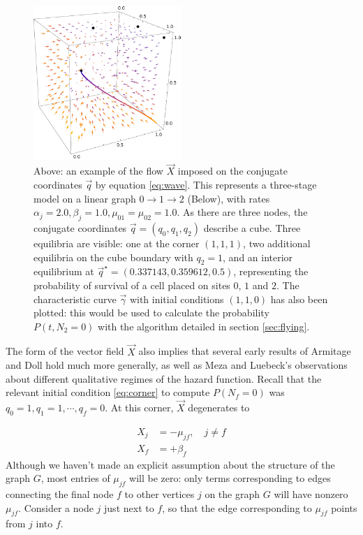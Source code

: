 \documentclass{article}
\begin{document}
\begin{figure}
    \includegraphics[width=0.5\textwidth]{figures/flowcube1}
    \caption{\label{fig:cube}Above: an example of the flow $\vec{X}$ imposed on the
    conjugate coordinates $\vec{q}$ by equation \eqref{eq:wave}. This represents
    a three-stage model on a linear graph $0 \rightarrow 1 \rightarrow 2$ (Below), with rates $\alpha_j = 2.0, \beta_j = 1.0, \mu_{01} = \mu_{02} = 1.0$. As
    there are three nodes, the conjugate coordinates $\vec{q}=(q_0,q_1,q_2)$
    describe a cube. Three equilibria are visible: one at the corner $(1,1,1)$,
    two additional equilibria on the cube boundary with $q_2 = 1$, and
    an interior equilibrium at $\vec{q}^\star = (0.337143, 0.359612, 0.5)$, representing the
    probability of survival of a cell placed on sites $0$, $1$ and $2$. The characteristic
    curve $\vec{\gamma}$ with initial conditions $(1,1,0)$ has also been
    plotted: this would be used to calculate the probability $P(t,N_2 = 0)$ with
    the algorithm detailed in section \ref{sec:flying}.}
\end{figure}

The form of the vector field $\vec{X}$ also implies that several early results
of Armitage and Doll hold much more generally, as well as Meza and Luebeck's observations about different qualitative regimes of the hazard function\cite{armitage1957two,meza2008age}. Recall that the relevant initial condition \eqref{eq:corner} to compute $P(N_f = 0)$ was $q_0 = 1, q_1 = 1, \cdots, q_f = 0$.  At this corner, $\vec{X}$ degenerates to

\begin{align}
    X_j &= - \mu_{jf}, \quad j \neq f
    \nonumber \\
    X_f &= + \beta_f
\end{align}
Although we haven't made an explicit assumption about the structure of the graph
$G$, most entries of $\mu_{jf}$ will be zero: only terms corresponding to edges
connecting the final node $f$ to other vertices $j$ on the graph $G$ will have
nonzero $\mu_{jf}$. Consider a node $j$ just next to $f$, so that the edge
corresponding to $\mu_{jf}$ points from $j$ into $f$.
\end{document}
